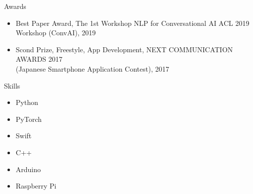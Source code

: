 \documentclass{resume} %
\begin{document}
\begin{rSection}{Awards}

\begin{itemize}
    \item Best Paper Award, The 1st Workshop NLP for Conversational AI ACL 2019 Workshop (ConvAI), 2019
    \item Scond Prize, Freestyle, App Development, NEXT COMMUNICATION AWARDS 2017
    \\(Japanese Smartphone Application Contest), 2017
\end{itemize}

\end{rSection}


\begin{rSection}{Skills}

\begin{multicols}{3}
\begin{itemize}
    \item Python
    \item PyTorch
    \item Swift
    \item C++
    \item Arduino
    \item Raspberry Pi
\end{itemize}
\end{multicols}

\end{rSection}

\end{document}
